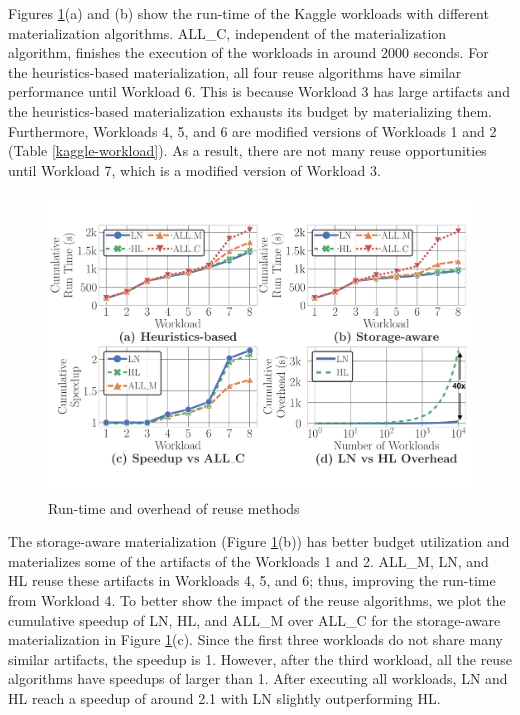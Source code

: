 Figures \ref{reuse-experiment}(a) and (b) show the run-time of the Kaggle workloads with different materialization algorithms.
ALL\_C, independent of the materialization algorithm, finishes the execution of the workloads in around 2000 seconds.
For the heuristics-based materialization, all four reuse algorithms have similar performance until Workload 6.
This is because Workload 3 has large artifacts and the heuristics-based materialization exhausts its budget by materializing them.
Furthermore, Workloads 4, 5, and 6 are modified versions of Workloads 1 and 2 (Table \ref{kaggle-workload}).
As a result, there are not many reuse opportunities until Workload 7, which is a modified version of Workload 3.
\begin{figure}[t]
\centering
\includegraphics[width=1.0\columnwidth]{images/experiment-results/kaggle_home_credit/reuse/reuse-times-perworkload-speedups-annotated}
\caption{Run-time and overhead of reuse methods}
\label{reuse-experiment}
\vspace{-4mm}
\end{figure}

The storage-aware materialization (Figure \ref{reuse-experiment}(b)) has better budget utilization and materializes some of the artifacts of the Workloads 1 and 2.
ALL\_M, LN, and HL reuse these artifacts in Workloads 4, 5, and 6; thus, improving the run-time from Workload 4.
To better show the impact of the reuse algorithms, we plot the cumulative speedup of LN, HL, and ALL\_M over ALL\_C for the storage-aware materialization in Figure \ref{reuse-experiment}(c).
Since the first three workloads do not share many similar artifacts, the speedup is 1.
However, after the third workload, all the reuse algorithms have speedups of larger than 1.
After executing all workloads, LN and HL reach a speedup of around 2.1 with LN slightly outperforming HL.

